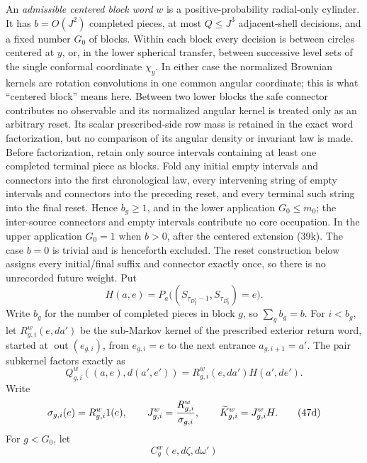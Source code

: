 An \emph{admissible centered block word} \(w\) is a positive-probability
radial-only cylinder.  It has \(b=O(J^2)\) completed pieces, at most
\(Q\le J^3\) adjacent-shell decisions, and a fixed
number \(G_0\) of blocks.  Within each block every decision is between
circles centered at \(y\), or, in the lower spherical transfer, between successive level
sets of the single conformal coordinate \(\chi_y\).  In either case the
normalized Brownian kernels are rotation convolutions in one common
angular coordinate; this is what ``centered block'' means here.  Between
two lower blocks the safe connector contributes no observable and its
normalized angular kernel is treated only as an arbitrary reset.  Its
scalar prescribed-side row mass is retained in the exact word
factorization, but no comparison of its angular density or invariant law
is made.  Before factorization, retain only source intervals containing
at least one completed terminal piece as blocks.  Fold any initial empty
intervals and connectors into the first chronological law, every
intervening string of empty intervals and connectors into the preceding
reset, and every terminal such string into the final reset.  Hence
\(b_g\ge1\), and in the lower application \(G_0\le m_0\); the
inter-source connectors and empty intervals contribute no core
occupation.  In the upper application \(G_0=1\) when \(b>0\), after the
centered extension (39k).  The case \(b=0\) is trivial and is henceforth
excluded.  The reset construction below assigns every initial/final
suffix and connector exactly once, so there is no unrecorded future
weight.  Put
\[
 H(a,e)=P_a\big((S_{\tau_{D_y^c}-1},S_{\tau_{D_y^c}})=e\big).
\]
Write \(b_g\) for the number of completed pieces in block \(g\), so
\(\sum_gb_g=b\).  For \(i<b_g\), let
\(R_{g,i}^w(e,da')\) be the sub-Markov kernel of the prescribed exterior
return word, started at \(\operatorname{out}(e_{g,i})\), from
\(e_{g,i}=e\) to the next entrance
\(a_{g,i+1}=a'\).  The pair subkernel factors exactly as
\begin{equation}
 Q_{g,i}^w((a,e),d(a',e'))=
       R_{g,i}^w(e,da')H(a',de').                           \tag{47c}\label{eq:tu-47c}
\end{equation}
Write
\begin{equation}
 \sigma_{g,i}(e)=R_{g,i}^w1(e),\qquad
 J_{g,i}^w={R_{g,i}^w\over\sigma_{g,i}},
 \qquad\widetilde K_{g,i}^w=J_{g,i}^wH.                    \tag{47d}\label{eq:tu-47d}
\end{equation}
For \(g<G_0\), let
\begin{equation}
 C_g^w(e,d\zeta,d\omega')                                  \tag{47d'}\label{eq:tu-47d-prime}
\end{equation}
